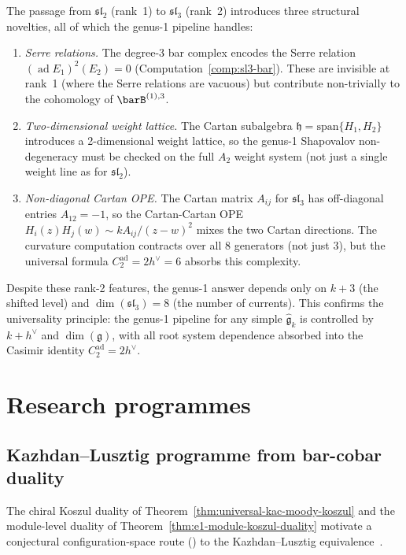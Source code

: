 \begin{remark}\label{rem:sl3-rank2}
The passage from $\mathfrak{sl}_2$ (rank~1) to $\mathfrak{sl}_3$ (rank~2) introduces three structural novelties, all of which the genus-1 pipeline handles:
\begin{enumerate}
\item \emph{Serre relations.}  The degree-3 bar complex encodes the Serre relation $(\operatorname{ad} E_1)^2(E_2) = 0$ (Computation~\ref{comp:sl3-bar}).  These are invisible at rank~1 (where the Serre relations are vacuous) but contribute non-trivially to the cohomology of $\barB^{(1),3}$.
\item \emph{Two-dimensional weight lattice.}  The Cartan subalgebra $\mathfrak{h} = \mathrm{span}\{H_1, H_2\}$ introduces a 2-dimensional weight lattice, so the genus-1 Shapovalov non-degeneracy must be checked on the full $A_2$ weight system (not just a single weight line as for $\mathfrak{sl}_2$).
\item \emph{Non-diagonal Cartan OPE.}  The Cartan matrix $A_{ij}$ for $\mathfrak{sl}_3$ has off-diagonal entries $A_{12} = -1$, so the Cartan-Cartan OPE $H_i(z)H_j(w) \sim kA_{ij}/(z-w)^2$ mixes the two Cartan directions.  The curvature computation contracts over all $8$ generators (not just $3$), but the universal formula $C_2^{\mathrm{ad}} = 2h^\vee = 6$ absorbs this complexity.
\end{enumerate}

Despite these rank-2 features, the genus-1 answer depends only on $k+3$ (the shifted level) and $\dim(\mathfrak{sl}_3) = 8$ (the number of currents).  This confirms the universality principle: the genus-1 pipeline for any simple $\widehat{\mathfrak{g}}_k$ is controlled by $k + h^\vee$ and $\dim(\mathfrak{g})$, with all root system dependence absorbed into the Casimir identity $C_2^{\mathrm{ad}} = 2h^\vee$.
\end{remark}

\section{Research programmes}

\subsection{Kazhdan--Lusztig programme from bar-cobar duality}
\label{subsec:kl-from-bar-cobar}

The chiral Koszul duality of Theorem~\ref{thm:universal-kac-moody-koszul}
and the module-level duality of Theorem~\ref{thm:e1-module-koszul-duality}
motivate a conjectural configuration-space route
(\ClaimStatusConjectured) to the Kazhdan--Lusztig
equivalence~\cite{KL93}.

